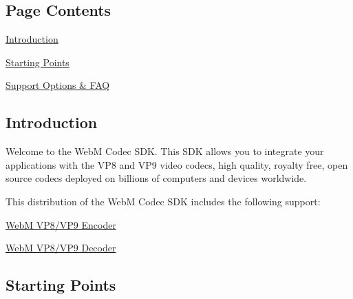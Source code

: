 \hypertarget{index_main_contents}{}\subsection{Page Contents}\label{index_main_contents}

\begin{DoxyItemize}
\item \hyperlink{index_main_intro}{Introduction}
\item \hyperlink{index_main_startpoints}{Starting Points}
\item \hyperlink{index_main_support}{Support Options \& F\+AQ}
\end{DoxyItemize}\hypertarget{index_main_intro}{}\subsection{Introduction}\label{index_main_intro}
Welcome to the WebM Codec S\+DK. This S\+DK allows you to integrate your applications with the V\+P8 and V\+P9 video codecs, high quality, royalty free, open source codecs deployed on billions of computers and devices worldwide.

This distribution of the WebM Codec S\+DK includes the following support\+:


\begin{DoxyItemize}
\item \hyperlink{group__vp8__encoder}{WebM V\+P8/\+V\+P9 Encoder}
\item \hyperlink{group__vp8__decoder}{WebM V\+P8/\+V\+P9 Decoder}
\end{DoxyItemize}\hypertarget{index_main_startpoints}{}\subsection{Starting Points}\label{index_main_startpoints}

